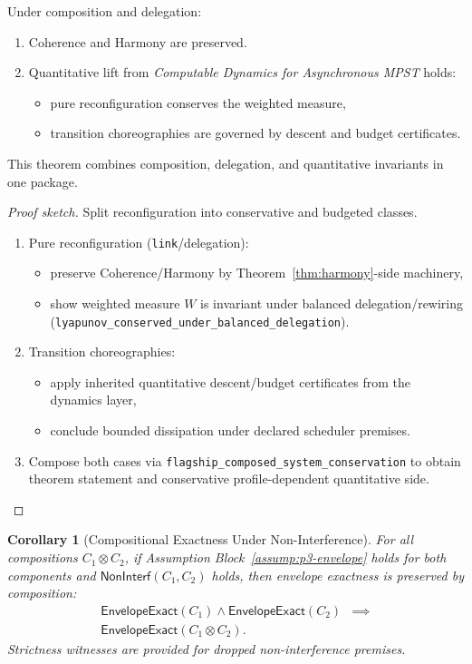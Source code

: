 \documentclass[a4paper,10pt,twocolumn,english]{article}
\numberwithin{equation}{section}
\theoremstyle{paperdef}
\theoremstyle{paperplain}
\newtheorem{corollary}[definition]{Corollary}
\theoremstyle{paperdef}
\theoremstyle{paperremark}
\theoremstyle{paperdef}
\newcommand{\EnvelopeExact}{\ensuremath{\mathsf{EnvelopeExact}}}
\begin{document}
Under composition and delegation:
\begin{enumerate}
	\item Coherence and Harmony are preserved.
	\item Quantitative lift from \emph{Computable Dynamics for Asynchronous MPST} holds:
	      \begin{itemize}
		      \item pure reconfiguration conserves the weighted measure,
		      \item transition choreographies are governed by descent and budget certificates.
	      \end{itemize}
\end{enumerate}

This theorem combines composition, delegation, and quantitative invariants in one package.

\begin{proof}[Proof sketch]
	Split reconfiguration into conservative and budgeted classes.

	\begin{enumerate}
		\item Pure reconfiguration (\texttt{link}/delegation):
		      \begin{itemize}
			      \item preserve Coherence/Harmony by Theorem~\ref{thm:harmony}-side machinery,
			      \item show weighted measure $W$ is invariant under balanced delegation/rewiring (\nolinkurl{lyapunov_conserved_under_balanced_delegation}).
		      \end{itemize}
		\item Transition choreographies:
		      \begin{itemize}
			      \item apply inherited quantitative descent/budget certificates from the dynamics layer,
			      \item conclude bounded dissipation under declared scheduler premises.
		      \end{itemize}
		\item Compose both cases via \nolinkurl{flagship_composed_system_conservation} to obtain theorem statement and conservative profile-dependent quantitative side.
	\end{enumerate}
\end{proof}

\begin{corollary}[Compositional Exactness Under Non-Interference]
	\label{cor:compositional}
	For all compositions $C_1 \otimes C_2$, if Assumption Block~\ref{assump:p3-envelope} holds for both components and $\mathsf{NonInterf}(C_1,C_2)$ holds, then envelope exactness is preserved by composition:
	\begin{equation}
		\begin{aligned}
			\EnvelopeExact(C_1) \land \EnvelopeExact(C_2)
			 & \implies \\
			\EnvelopeExact(C_1 \otimes C_2).
		\end{aligned}
	\end{equation}
	Strictness witnesses are provided for dropped non-interference premises.
\end{corollary}
\end{document}
